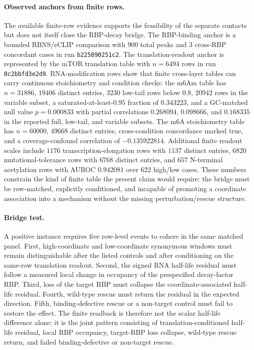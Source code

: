 \paragraph{Observed anchors from finite rows.}
The available finite-row evidence supports the feasibility of the separate contacts but does not itself close the RBP-decay bridge.  The RBP-binding anchor is a bounded RBNS/eCLIP comparison with $900$ total peaks and $3$ cross-RBP concordant cases in run \texttt{b225890251c2}.  The translation-readout anchor is represented by the mTOR translation table with $n=6494$ rows in run \texttt{0c2bbfd3e2d9}.  RNA-modification rows show that finite cross-layer tables can carry continuous stoichiometry and condition checks: the m6Am table has $n=31886$, $19406$ distinct entries, $3230$ low-tail rows below $0.8$, $20942$ rows in the variable subset, a saturated-at-least-$0.95$ fraction of $0.343223$, and a GC-matched null value $p=0.000833$ with partial correlations $0.268094$, $0.098666$, and $0.168335$ in the reported full, low-tail, and variable subsets.  The m6A stoichiometry table has $n=60000$, $49668$ distinct entries, cross-condition concordance marked true, and a coverage-confound correlation of $-0.135922814$.  Additional finite readout scales include $1176$ transcription-elongation rows with $1137$ distinct entries, $6820$ mutational-tolerance rows with $6768$ distinct entries, and $657$ N-terminal acetylation rows with AUROC $0.942081$ over $622$ high/low cases.  These numbers constrain the kind of finite table the present claim would require: the bridge must be row-matched, explicitly conditioned, and incapable of promoting a coordinate association into a mechanism without the missing perturbation/rescue structure.

\paragraph{Bridge test.}
A positive instance requires five row-level events to cohere in the same matched panel.  First, high-coordinate and low-coordinate synonymous windows must remain distinguishable after the listed controls and after conditioning on the same-row translation readout.  Second, the signed RNA half-life residual must follow a measured local change in occupancy of the prespecified decay-factor RBP.  Third, loss of the target RBP must collapse the coordinate-associated half-life residual.  Fourth, wild-type rescue must return the residual in the expected direction.  Fifth, binding-defective rescue or a non-target control must fail to restore the effect.  The finite readback is therefore not the scalar half-life difference alone; it is the joint pattern consisting of translation-conditioned half-life residual, local RBP occupancy, target-RBP loss collapse, wild-type rescue return, and failed binding-defective or non-target rescue.

